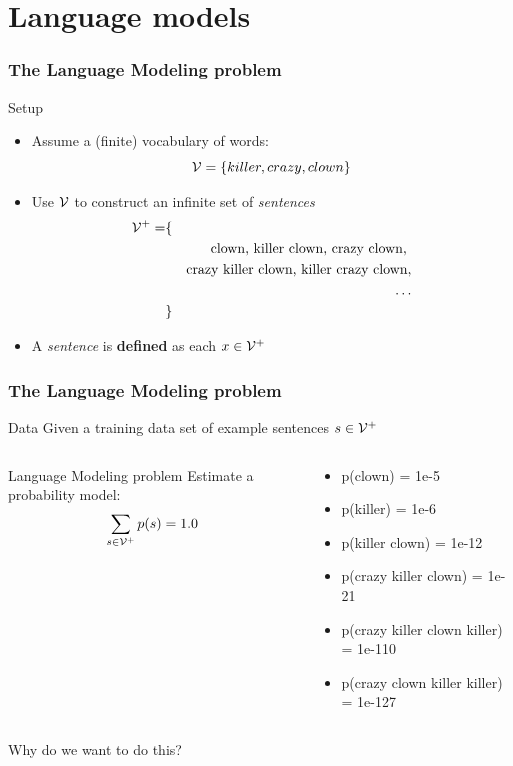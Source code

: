 



\section{Language models}

\begin{frame}
\frametitle{The Language Modeling problem}
\begin{block}{Setup}
\begin{itemize}[<+->]
\item Assume a (finite) vocabulary of words:
\[ {\cal V} = \{ killer, crazy, clown \} \]
\item Use ${\cal V}$ to construct an infinite set of \textit{sentences} 
\begin{eqnarray*} 
{\cal V}^+ = & \{ & \\
&& \mbox{clown, killer clown, crazy clown, } \\
&& \mbox{crazy killer clown, killer crazy clown}, \\
&& \ldots \\
& \} &
\end{eqnarray*}
\item A \textit{sentence} is \textbf{defined} as each $x \in {\cal V}^+$
\end{itemize}
\end{block}
\end{frame}

\begin{frame}
\frametitle{The Language Modeling problem}
\begin{block}{Data}
Given a training data set of example sentences $s \in {\cal V}^+$
\end{block}
\pause
\begin{columns}
    \begin{block}{Language Modeling problem}
    Estimate a probability model:
    \[ \sum_{s \in {\cal V}^+} p(s) = 1.0 \]
    \end{block}
    \begin{block}{}
    \begin{itemize}
    \item p(clown) = 1e-5
    \item p(killer) = 1e-6
    \item {\small p(killer clown) = 1e-12}
    \item {\footnotesize p(crazy killer clown) = 1e-21}
    \item {\tiny p(crazy killer clown killer) = 1e-110}
    \item {\tiny p(crazy clown killer killer) = 1e-127}
    \end{itemize}
    \end{block}
\end{columns}
\begin{alertblock}{Why do we want to do this?}
\end{alertblock}
\end{frame}

